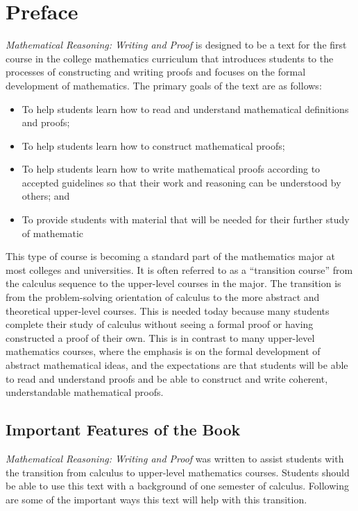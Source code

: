 
\chapter{Preface}
\emph{Mathematical Reasoning:  Writing and Proof} is designed to be a text for the first course in the college mathematics curriculum that introduces students to the processes of constructing and writing proofs and focuses on the formal development of mathematics.    The primary goals of the text are as follows:
\begin{itemize}
\item To help students learn how to read and understand mathematical definitions and proofs;
\item To help students learn how to construct mathematical proofs;
\item To help students learn how to write mathematical proofs according to accepted guidelines so that their work and reasoning can be understood by others; and 
\item To provide students with material that will be needed for their further study of mathematic
\end{itemize}

This type of course is becoming a standard part of the mathematics major at most colleges and universities.  It is often referred to as a ``transition course'' from the calculus sequence to the upper-level courses in the major.  The transition is from the problem-solving orientation of calculus to the more abstract and theoretical upper-level courses.  This is needed today because %
many students complete their study of calculus without seeing a formal proof or having constructed a proof of their own.  This is in contrast to many upper-level mathematics courses, where the emphasis is on the formal development of abstract mathematical ideas, and the expectations are that students will be able to read and  understand proofs and be able to construct and write coherent, understandable mathematical proofs.

\section*{Important Features of the Book}
\emph{Mathematical Reasoning: Writing and Proof} was written to assist students with the transition from calculus to upper-level mathematics courses.  Students should be able to use this text with a background of one semester of calculus.  Following are some of the important ways this text will help with this transition.

